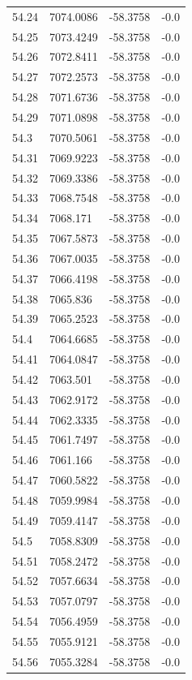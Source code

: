 \begin{table}[H]
\begin{tabular}{llll}
54.24 & 7074.0086 & -58.3758 & -0.0 \\
54.25 & 7073.4249 & -58.3758 & -0.0 \\
54.26 & 7072.8411 & -58.3758 & -0.0 \\
54.27 & 7072.2573 & -58.3758 & -0.0 \\
54.28 & 7071.6736 & -58.3758 & -0.0 \\
54.29 & 7071.0898 & -58.3758 & -0.0 \\
54.3 & 7070.5061 & -58.3758 & -0.0 \\
54.31 & 7069.9223 & -58.3758 & -0.0 \\
54.32 & 7069.3386 & -58.3758 & -0.0 \\
54.33 & 7068.7548 & -58.3758 & -0.0 \\
54.34 & 7068.171 & -58.3758 & -0.0 \\
54.35 & 7067.5873 & -58.3758 & -0.0 \\
54.36 & 7067.0035 & -58.3758 & -0.0 \\
54.37 & 7066.4198 & -58.3758 & -0.0 \\
54.38 & 7065.836 & -58.3758 & -0.0 \\
54.39 & 7065.2523 & -58.3758 & -0.0 \\
54.4 & 7064.6685 & -58.3758 & -0.0 \\
54.41 & 7064.0847 & -58.3758 & -0.0 \\
54.42 & 7063.501 & -58.3758 & -0.0 \\
54.43 & 7062.9172 & -58.3758 & -0.0 \\
54.44 & 7062.3335 & -58.3758 & -0.0 \\
54.45 & 7061.7497 & -58.3758 & -0.0 \\
54.46 & 7061.166 & -58.3758 & -0.0 \\
54.47 & 7060.5822 & -58.3758 & -0.0 \\
54.48 & 7059.9984 & -58.3758 & -0.0 \\
54.49 & 7059.4147 & -58.3758 & -0.0 \\
54.5 & 7058.8309 & -58.3758 & -0.0 \\
54.51 & 7058.2472 & -58.3758 & -0.0 \\
54.52 & 7057.6634 & -58.3758 & -0.0 \\
54.53 & 7057.0797 & -58.3758 & -0.0 \\
54.54 & 7056.4959 & -58.3758 & -0.0 \\
54.55 & 7055.9121 & -58.3758 & -0.0 \\
54.56 & 7055.3284 & -58.3758 & -0.0 \\

\end{tabular}
\end{table}
